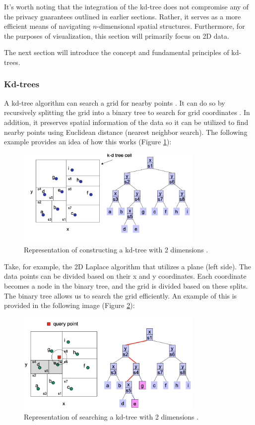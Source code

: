It's worth noting that the integration of the kd-tree does not compromise any of the privacy guarantees outlined in earlier sections. 
Rather, it serves as a more efficient means of navigating $n$-dimensional spatial structures. 
Furthermore, for the purposes of visualization, this section will primarily focus on 2D data.

The next section will introduce the concept and fundamental principles of kd-trees. 
\newpage
\subsubsection*{Kd-trees} \label{theory:kd-trees}
A kd-tree algorithm can search a grid for nearby points \citep{bentley_multidimensional_1975}.
It can do so by recursively splitting the grid into a binary tree to search for grid coordinates \citep{washington_k-d_2002}.
In addition, it preserves spatial information of the data so it can be utilized to find nearby points using Euclidean distance (nearest neighbor search).
The following example provides an idea of how this works (Figure \ref{fig:kd-tree-theory}):
\begin{figure}[H]
  \includegraphics[width=0.8\textwidth]{TheorethicalFramework/ND-Laplace/Images/kd-tree-part1.png}
  \caption{Representation of constructing a kd-tree with 2 dimensions \citep{washington_k-d_2002}.}
  \label{fig:kd-tree-theory}
\end{figure}
Take, for example, the 2D Laplace algorithm that utilizes a plane (left side).
The data points can be divided based on their x and y coordinates.
Each coordinate becomes a node in the binary tree, and the grid is divided based on these splits.
The binary tree allows us to search the grid efficiently.
An example of this is provided in the following image (Figure \ref{fig:kd-tree-searching-theory}):
\begin{figure}[H]
  \includegraphics[width=0.8\textwidth]{TheorethicalFramework/ND-Laplace/Images/kd-tree-part2.png}
  \caption{Representation of searching a kd-tree with 2 dimensions \citep{washington_k-d_2002}.}
  \label{fig:kd-tree-searching-theory}
\end{figure}
